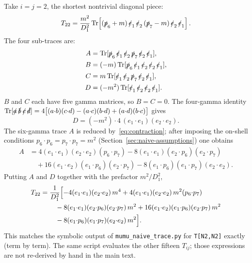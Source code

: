 \documentclass[11pt]{article}
\begin{document}
Take $i=j=2$, the shortest nontrivial diagonal piece:
\begin{equation}
  T_{22}
  = \frac{m^2}{D_1^2}\,
    \mathrm{Tr}\!\left[
      (\slashed p_6+m)\,
      \slashed e_1\,\slashed e_2\,
      (\slashed p_7-m)\,
      \slashed e_2\,\slashed e_1
    \right].
\end{equation}
The four sub-traces are:
\begin{align}
  A &= \mathrm{Tr}[\slashed p_6\,\slashed e_1\,\slashed e_2\,
                   \slashed p_7\,\slashed e_2\,\slashed e_1],
  \nonumber\\
  B &= (-m)\,\mathrm{Tr}[\slashed p_6\,\slashed e_1\,\slashed e_2\,
                         \slashed e_2\,\slashed e_1],
  \nonumber\\
  C &= m\,\mathrm{Tr}[\slashed e_1\,\slashed e_2\,
                      \slashed p_7\,\slashed e_2\,\slashed e_1],
  \nonumber\\
  D &= (-m^2)\,\mathrm{Tr}[\slashed e_1\,\slashed e_2\,
                           \slashed e_2\,\slashed e_1].
  \label{eq:T22-parts}
\end{align}
$B$ and $C$ each have five gamma matrices, so $B=C=0$. The four-gamma
identity
$\mathrm{Tr}[\slashed a\,\slashed b\,\slashed c\,\slashed d]
=4\bigl[(a{\cdot}b)(c{\cdot}d)-(a{\cdot}c)(b{\cdot}d)+(a{\cdot}d)(b{\cdot}c)\bigr]$
gives
\begin{equation}
  D = (-m^2)\cdot 4\,(e_1{\cdot}e_1)(e_2{\cdot}e_2).
\end{equation}
The six-gamma trace $A$ is reduced by~\eqref{eq:contraction}; after
imposing the on-shell conditions $p_6{\cdot}p_6=p_7{\cdot}p_7=m^2$
(Section~\ref{sec:naive-assumptions}) one obtains
\begin{align}
  A &= 4(e_1{\cdot}e_1)(e_2{\cdot}e_2)(p_6{\cdot}p_7)
      - 8(e_1{\cdot}e_1)(e_2{\cdot}p_6)(e_2{\cdot}p_7)
      \nonumber\\
    &\quad + 16(e_1{\cdot}e_2)(e_1{\cdot}p_6)(e_2{\cdot}p_7)
      - 8(e_1{\cdot}p_6)(e_1{\cdot}p_7)(e_2{\cdot}e_2).
\end{align}
Putting $A$ and $D$ together with the prefactor $m^2/D_1^2$,
\begin{align}
  T_{22}
  &= \frac{1}{D_1^2}\Bigl[
       -4(e_1{\cdot}e_1)(e_2{\cdot}e_2)\,m^4
       +4(e_1{\cdot}e_1)(e_2{\cdot}e_2)\,m^2(p_6{\cdot}p_7)
       \nonumber\\
  &\hspace{2.2em}
       -8(e_1{\cdot}e_1)(e_2{\cdot}p_6)(e_2{\cdot}p_7)\,m^2
       +16(e_1{\cdot}e_2)(e_1{\cdot}p_6)(e_2{\cdot}p_7)\,m^2
       \nonumber\\
  &\hspace{2.2em}
       -8(e_1{\cdot}p_6)(e_1{\cdot}p_7)(e_2{\cdot}e_2)\,m^2
     \Bigr].
  \label{eq:T22-result}
\end{align}
This matches the symbolic output of \texttt{mumu\_naive\_trace.py} for
\texttt{T[N2,N2]} exactly (term by term). The same script evaluates the
other fifteen $T_{ij}$; those expressions are not re-derived by hand in
the main text.
\end{document}
